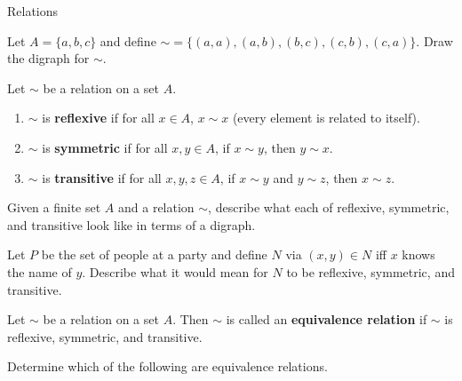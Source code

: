 \begin{section}{Relations}
\begin{example}
\end{example}

\begin{exercise}
Let $A=\{a,b,c\}$ and define $\sim=\{(a,a),(a,b),(b,c),(c,b),(c,a)\}$.  Draw the digraph for $\sim$.
\end{exercise}

\begin{definition}
Let $\sim$ be a relation on a set $A$.
\begin{enumerate}
\item $\sim$ is \textbf{reflexive} if for all $x\in A$, $x\sim x$ (every element is related to itself).
\item $\sim$ is \textbf{symmetric} if for all $x,y\in A$, if $x\sim y$, then $y\sim x$.
\item $\sim$ is \textbf{transitive} if for all $x,y,z\in A$, if $x\sim y$ and $y\sim z$, then $x\sim z$.
\end{enumerate}
\end{definition}

\begin{exercise}
Given a finite set $A$ and a relation $\sim$, describe what each of reflexive, symmetric, and transitive look like in terms of a digraph.
\end{exercise}

\begin{exercise}
Let $P$ be the set of people at a party and define $N$ via $(x,y)\in N$ iff $x$ knows the name of $y$.  Describe what it would mean for $N$ to be reflexive, symmetric, and transitive.
\end{exercise}

\begin{definition}
Let $\sim$ be a relation on a set $A$.  Then $\sim$ is called an \textbf{equivalence relation} if $\sim$ is reflexive, symmetric, and transitive.
\end{definition}

\begin{exercise}
Determine which of the following are equivalence relations.


\end{exercise}
\end{section}
